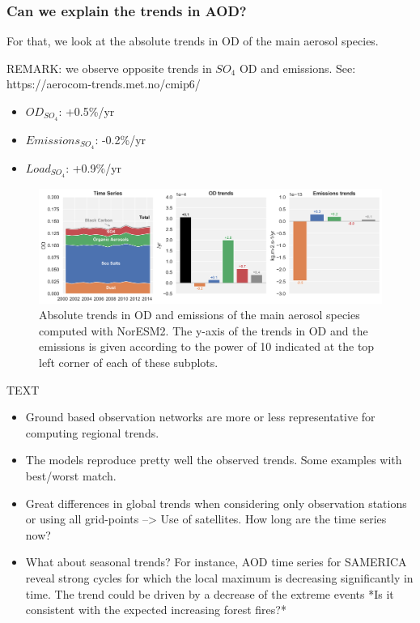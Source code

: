 \documentclass[journal abbreviation, manuscript]{copernicus}
\begin{document}
\subsubsection{Can we explain the trends in AOD?}
For that,  we look at the absolute trends in OD of the main aerosol species.

REMARK: we observe opposite trends in $SO_{4}$ OD and emissions.
See: https://aerocom-trends.met.no/cmip6/
\begin{itemize}
 \item $OD_{SO_{4}}$: +0.5\%/yr
 \item $Emissions_{SO_{4}}$: -0.2\%/yr
 \item $Load_{SO_{4}}$: +0.9\%/yr
\end{itemize}


\begin{figure}[t]
 \includegraphics[width=16cm]{../scripts/figs/abs_species_trends.png}
 \caption{Absolute trends in OD and emissions of the main aerosol species computed with NorESM2. The y-axis of the trends in OD and the emissions is given according to the power of 10 indicated at the top left corner of each of these subplots.}
 \label{species_abs_trends}
\end{figure}




\conclusions  %
TEXT
\begin{itemize}
 \item Ground based observation networks are more or less representative for computing regional trends.
 \item The models reproduce pretty well the observed trends. Some examples with best/worst match.
 \item Great differences in global trends when considering only observation stations or using all grid-points --> Use of satellites. How long are the time series now?
 \item What about seasonal trends? For instance, AOD time series for SAMERICA reveal strong cycles for which the local maximum is decreasing significantly in time. The trend could be driven by a decrease of the extreme events *Is it consistent with the expected increasing forest fires?*
\end{itemize}
\end{document}
